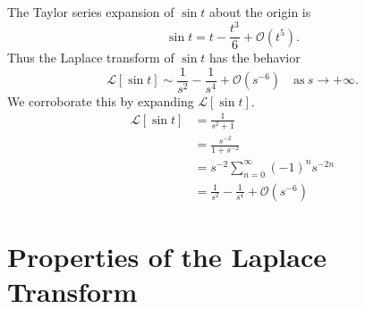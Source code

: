 \begin{Example}
  The Taylor series expansion of $\sin t$ about the origin is
  \[
  \sin t = t - \frac{t^3}{6} + \mathcal{O}(t^5).
  \]
  Thus the Laplace transform of $\sin t$ has the behavior
  \[
  \mathcal{L}[\sin t] \sim \frac{1}{s^2} - \frac{1}{s^4} + \mathcal{O}(s^{-6})
  \quad \mathrm{as}\ s \to + \infty.
  \]
  We corroborate this by expanding $\mathcal{L}[\sin t]$.
  \begin{align*}
    \mathcal{L}[\sin t]
    &= \frac{1}{s^2 + 1} \\
    &= \frac{s^{-2}}{1 + s^{-2}} \\
    &= s^{-2} \sum_{n = 0}^\infty (-1)^n s^{-2n} \\
    &= \frac{1}{s^2} - \frac{1}{s^4} + \mathcal{O}(s^{-6})
  \end{align*}
\end{Example}










\section{Properties of the Laplace Transform}





